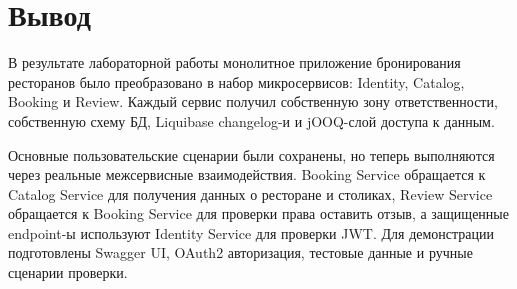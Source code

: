 \documentclass[14pt,a4paper]{extarticle}
\begin{document}
\section{Вывод}

В результате лабораторной работы монолитное приложение бронирования ресторанов было преобразовано в набор микросервисов: Identity, Catalog, Booking и Review. Каждый сервис получил собственную зону ответственности, собственную схему БД, Liquibase changelog-и и jOOQ-слой доступа к данным.

Основные пользовательские сценарии были сохранены, но теперь выполняются через реальные межсервисные взаимодействия. Booking Service обращается к Catalog Service для получения данных о ресторане и столиках, Review Service обращается к Booking Service для проверки права оставить отзыв, а защищенные endpoint-ы используют Identity Service для проверки JWT. Для демонстрации подготовлены Swagger UI, OAuth2 авторизация, тестовые данные и ручные сценарии проверки.
\end{document}
